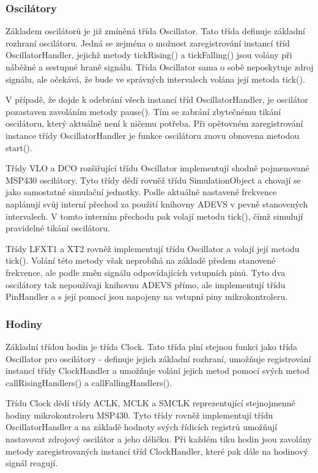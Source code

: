 \subsubsection{Oscilátory}

Základem oscilátorů je již zmíněná třída Oscillator. Tato třída definuje základní rozhraní oscilátoru. Jedná se zejména o možnost zaregistrování instancí tříd OscillatorHandler, jejichž metody tickRising() a tickFalling() jsou volány při náběžné a sestupné hraně signálu. Třída Oscillator sama o sobě neposkytuje zdroj signálu, ale očekává, že bude ve správných intervalech volána její metoda tick().

V případě, že dojde k odebrání všech instancí tříd OscillatorHandler, je oscilátor pozastaven zavoláním metody pause(). Tím se zabrání zbytečnému tikání oscilátoru, který aktuálně není k ničemu potřeba. Při opětovném zaregistrování instance třídy OscillatorHandler je funkce oscilátoru znovu obnovena metodou start().

Třídy VLO a DCO rozšiřující třídu Oscillator implementují shodně pojmenované MSP430 oscilátory. Tyto třídy dědí rovněž třídu SimulationObject a chovají se jako samostatné simulační jednotky. Podle aktuálně nastavené frekvence naplánují svůj interní přechod za použití knihovny ADEVS v pevně stanovených intervalech. V tomto interním přechodu pak volají metodu tick(), čímž simulují pravidelné tikání oscilátoru.

Třídy LFXT1 a XT2 rovněž implementují třídu Oscillator a volají její metodu tick(). Volání této metody však neprobíhá na základě předem stanovené frekvence, ale podle změn signálu odpovídajících vstupních pinů. Tyto dva oscilátory tak nepoužívaji knihovnu ADEVS přímo, ale implementují třídu PinHandler a s její pomocí jsou napojeny na vstupní piny mikrokontroleru.

\subsubsection{Hodiny}

Základní třídou hodin je třída Clock. Tato třída plní stejnou funkci jako třída Oscillator pro oscilátory - definuje jejich základní rozhraní, umožňuje registrování instancí třídy ClockHandler a umožňuje volání jejich metod pomocí svých metod callRisingHandlers() a callFallingHandlers().

Třídu Clock dědí třídy ACLK, MCLK a SMCLK reprezentující stejnojmenné hodiny mikrokontroleru MSP430. Tyto třídy rovněž implementují třídu OscillatorHandler a na základě hodnoty svých řídicích registrů umožňují nastavovat zdrojový oscilátor a jeho děličku. Při každém tiku hodin jsou zavolány metody zaregistrovaných instancí tříd ClockHandler, které pak dále na hodinový signál reagují.

